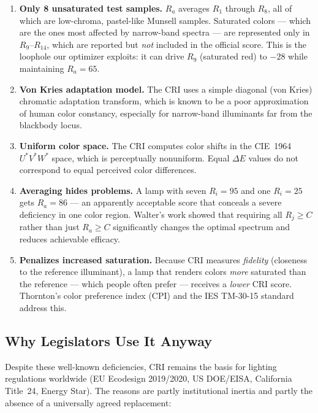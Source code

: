 \documentclass[11pt]{article}
\begin{document}
\begin{enumerate}
\item \textbf{Only 8 unsaturated test samples.}  $R_a$ averages $R_1$
  through $R_8$, all of which are low-chroma, pastel-like Munsell
  samples.  Saturated colors --- which are the ones most affected by
  narrow-band spectra --- are represented only in $R_9$--$R_{14}$, which
  are reported but \emph{not} included in the official score.  This is the
  loophole our optimizer exploits: it can drive $R_9$ (saturated red) to
  $-28$ while maintaining $R_a = 65$.

\item \textbf{Von Kries adaptation model.}  The CRI uses a simple
  diagonal (von Kries) chromatic adaptation transform, which is known to
  be a poor approximation of human color constancy, especially for
  narrow-band illuminants far from the blackbody locus.

\item \textbf{Uniform color space.}  The CRI computes color shifts in the
  CIE~1964 $U^*V^*W^*$ space, which is perceptually nonuniform.
  Equal $\Delta E$ values do not correspond to equal perceived color
  differences.

\item \textbf{Averaging hides problems.}  A lamp with seven $R_i = 95$
  and one $R_i = 25$ gets $R_a = 86$ --- an apparently acceptable score
  that conceals a severe deficiency in one color region.  Walter's work
  showed that requiring all $R_j \geq C$ rather than just $R_a \geq C$
  significantly changes the optimal spectrum and reduces achievable
  efficacy.

\item \textbf{Penalizes increased saturation.}  Because CRI measures
  \emph{fidelity} (closeness to the reference illuminant), a lamp that
  renders colors \emph{more} saturated than the reference --- which
  people often prefer --- receives a \emph{lower} CRI score.
  Thornton's color preference index (CPI) and the IES TM-30-15
  standard~\cite{tm30} address this.
\end{enumerate}

\subsection{Why Legislators Use It Anyway}

Despite these well-known deficiencies, CRI remains the basis for
lighting regulations worldwide (EU Ecodesign 2019/2020, US DOE/EISA,
California Title~24, Energy Star).  The reasons are partly institutional
inertia and partly the absence of a universally agreed replacement:
\end{document}

